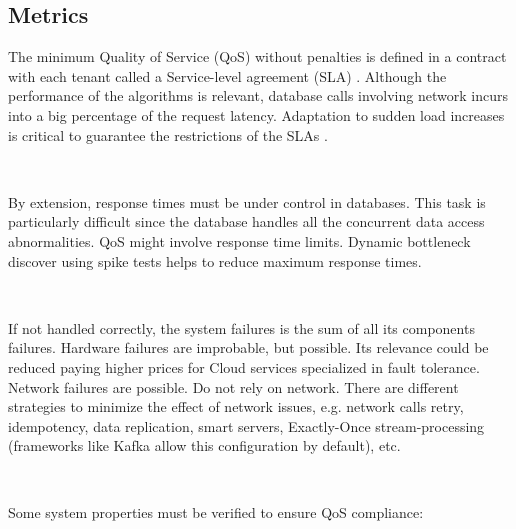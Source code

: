 \documentclass[12pt,english]{article} %
\begin{document}
\subsection{Metrics}

The minimum Quality of Service (QoS) without penalties is defined in a contract with each tenant called a Service-level agreement (SLA) \cite{cooper2009}.
Although the performance of the algorithms is relevant, database calls involving network incurs into a big percentage of the request latency.
Adaptation to sudden load increases is critical to guarantee the restrictions of the SLAs
\cite{elmore2011}. 

\

By extension, response times must be under control in databases.
This task is particularly difficult since the database handles all the concurrent data access abnormalities.
QoS might involve response time limits.
Dynamic bottleneck discover using spike tests helps to reduce maximum response times.

\

If not handled correctly, the system failures is the sum of all its components failures.
Hardware failures are improbable, but possible.
Its relevance could be reduced paying higher prices for Cloud services specialized in fault tolerance.
Network failures are possible.
Do not rely on network.
There are different strategies to minimize the effect of network issues, e.g. network calls retry, idempotency, data replication, smart servers, Exactly-Once stream-processing (frameworks like Kafka allow this configuration by default), etc. 

\

Some system properties must be verified to ensure QoS compliance:
\end{document}
